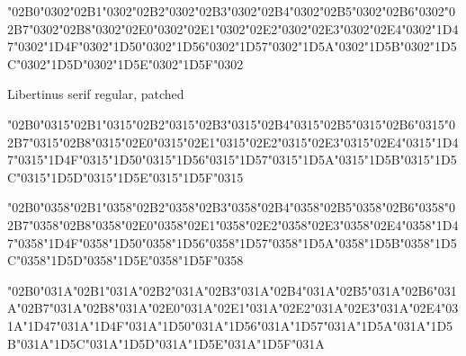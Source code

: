 \documentclass[landscape]{article}
\newcommand{\gs}{\hspace{0.5mm}}	%
\begin{document}
\char"02B0\char"0302\gs \char"02B1\char"0302\gs \char"02B2\char"0302\gs \char"02B3\char"0302\gs \char"02B4\char"0302\gs \char"02B5\char"0302\gs \char"02B6\char"0302\gs \char"02B7\char"0302\gs \char"02B8\char"0302\gs \char"02E0\char"0302\gs \char"02E1\char"0302\gs \char"02E2\char"0302\gs \char"02E3\char"0302\gs \char"02E4\char"0302\gs \char"1D47\char"0302\gs \char"1D4F\char"0302\gs \char"1D50\char"0302\gs \char"1D56\char"0302\gs \char"1D57\char"0302\gs \char"1D5A\char"0302\gs \char"1D5B\char"0302\gs \char"1D5C\char"0302\gs \char"1D5D\char"0302\gs \char"1D5E\char"0302\gs \char"1D5F\char"0302


Libertinus serif regular, patched

{\LibertinusSerifPatch
\char"02B0\char"0315\gs \char"02B1\char"0315\gs \char"02B2\char"0315\gs \char"02B3\char"0315\gs \char"02B4\char"0315\gs \char"02B5\char"0315\gs \char"02B6\char"0315\gs \char"02B7\char"0315\gs \char"02B8\char"0315\gs \char"02E0\char"0315\gs \char"02E1\char"0315\gs \char"02E2\char"0315\gs \char"02E3\char"0315\gs \char"02E4\char"0315\gs \char"1D47\char"0315\gs \char"1D4F\char"0315\gs \char"1D50\char"0315\gs \char"1D56\char"0315\gs \char"1D57\char"0315\gs \char"1D5A\char"0315\gs \char"1D5B\char"0315\gs \char"1D5C\char"0315\gs \char"1D5D\char"0315\gs \char"1D5E\char"0315\gs \char"1D5F\char"0315
	
\char"02B0\char"0358\gs \char"02B1\char"0358\gs \char"02B2\char"0358\gs \char"02B3\char"0358\gs \char"02B4\char"0358\gs \char"02B5\char"0358\gs \char"02B6\char"0358\gs \char"02B7\char"0358\gs \char"02B8\char"0358\gs \char"02E0\char"0358\gs \char"02E1\char"0358\gs \char"02E2\char"0358\gs \char"02E3\char"0358\gs \char"02E4\char"0358\gs \char"1D47\char"0358\gs \char"1D4F\char"0358\gs \char"1D50\char"0358\gs \char"1D56\char"0358\gs \char"1D57\char"0358\gs \char"1D5A\char"0358\gs \char"1D5B\char"0358\gs \char"1D5C\char"0358\gs \char"1D5D\char"0358\gs \char"1D5E\char"0358\gs \char"1D5F\char"0358
	
\char"02B0\char"031A\gs \char"02B1\char"031A\gs \char"02B2\char"031A\gs \char"02B3\char"031A\gs \char"02B4\char"031A\gs \char"02B5\char"031A\gs \char"02B6\char"031A\gs \char"02B7\char"031A\gs \char"02B8\char"031A\gs \char"02E0\char"031A\gs \char"02E1\char"031A\gs \char"02E2\char"031A\gs \char"02E3\char"031A\gs \char"02E4\char"031A\gs \char"1D47\char"031A\gs \char"1D4F\char"031A\gs \char"1D50\char"031A\gs \char"1D56\char"031A\gs \char"1D57\char"031A\gs \char"1D5A\char"031A\gs \char"1D5B\char"031A\gs \char"1D5C\char"031A\gs \char"1D5D\char"031A\gs \char"1D5E\char"031A\gs \char"1D5F\char"031A

}
\end{document}
